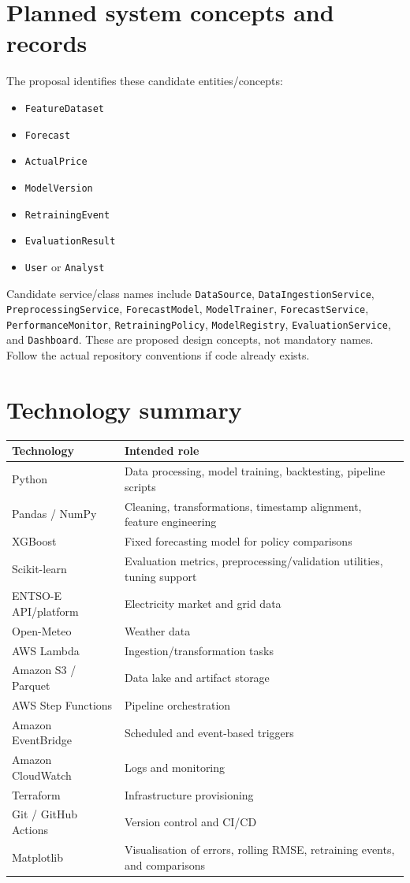 \documentclass[11pt,a4paper]{article}
\begin{document}
\section{Planned system concepts and records}
The proposal identifies these candidate entities/concepts:
\begin{itemize}
  \item \texttt{FeatureDataset}
  \item \texttt{Forecast}
  \item \texttt{ActualPrice}
  \item \texttt{ModelVersion}
  \item \texttt{RetrainingEvent}
  \item \texttt{EvaluationResult}
  \item \texttt{User} or \texttt{Analyst}
\end{itemize}
Candidate service/class names include \texttt{DataSource}, \texttt{DataIngestionService}, \texttt{PreprocessingService}, \texttt{ForecastModel}, \texttt{ModelTrainer}, \texttt{ForecastService}, \texttt{PerformanceMonitor}, \texttt{RetrainingPolicy}, \texttt{ModelRegistry}, \texttt{EvaluationService}, and \texttt{Dashboard}. These are proposed design concepts, not mandatory names. Follow the actual repository conventions if code already exists.

\section{Technology summary}
\begin{longtable}{@{}p{}p{}@{}}
\toprule
\textbf{Technology} & \textbf{Intended role} \\
\midrule
Python & Data processing, model training, backtesting, pipeline scripts \\
Pandas / NumPy & Cleaning, transformations, timestamp alignment, feature engineering \\
XGBoost & Fixed forecasting model for policy comparisons \\
Scikit-learn & Evaluation metrics, preprocessing/validation utilities, tuning support \\
ENTSO-E API/platform & Electricity market and grid data \\
Open-Meteo & Weather data \\
AWS Lambda & Ingestion/transformation tasks \\
Amazon S3 / Parquet & Data lake and artifact storage \\
AWS Step Functions & Pipeline orchestration \\
Amazon EventBridge & Scheduled and event-based triggers \\
Amazon CloudWatch & Logs and monitoring \\
Terraform & Infrastructure provisioning \\
Git / GitHub Actions & Version control and CI/CD \\
Matplotlib & Visualisation of errors, rolling RMSE, retraining events, and comparisons \\
\bottomrule
\end{longtable}
\end{document}
